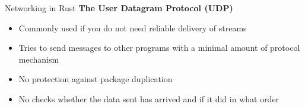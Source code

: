 \begin{frame}{Networking in Rust}
    \textbf{The User Datagram Protocol (UDP)}
    \begin{itemize}
        \item<2-> Commonly used if you do not need reliable delivery of streams
        \item<3-> Tries to send messages to other programs with a minimal amount of protocol mechanism
        \item<4-> No protection against package duplication
        \item<5> No checks whether the data sent has arrived and if it did in what order
    \end{itemize}

\end{frame}
